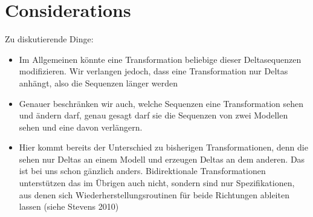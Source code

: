 \section{Considerations}

Zu diskutierende Dinge:
\begin{itemize}
    \item Im Allgemeinen könnte eine Transformation beliebige dieser Deltasequenzen modifizieren. Wir verlangen jedoch, dass eine Transformation nur Deltas anhängt, also die Sequenzen länger werden
    \item Genauer beschränken wir auch, welche Sequenzen eine Transformation sehen und ändern darf, genau gesagt darf sie die Sequenzen von zwei Modellen sehen und eine davon verlängern.
    \item Hier kommt bereits der Unterschied zu bisherigen Transformationen, denn die sehen nur Deltas an einem Modell und erzeugen Deltas an dem anderen. Das ist bei uns schon gänzlich anders. Bidirektionale Transformationen unterstützen das im Übrigen auch nicht, sondern sind nur Spezifikationen, aus denen sich Wiederherstellungsroutinen für beide Richtungen ableiten lassen (siehe Stevens 2010)
\end{itemize}


